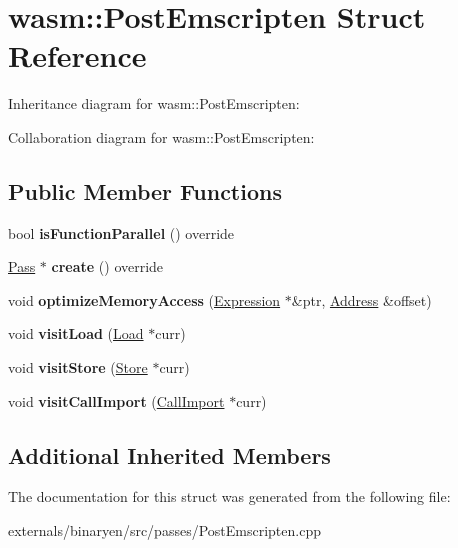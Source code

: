 \hypertarget{structwasm_1_1_post_emscripten}{}\section{wasm\+:\+:Post\+Emscripten Struct Reference}
\label{structwasm_1_1_post_emscripten}


Inheritance diagram for wasm\+:\+:Post\+Emscripten\+:


Collaboration diagram for wasm\+:\+:Post\+Emscripten\+:
\subsection*{Public Member Functions}
\begin{DoxyCompactItemize}
\item 
\mbox{\label{structwasm_1_1_post_emscripten_af1d8b75349818edc075f64f97688be9a}} 
bool {\bfseries is\+Function\+Parallel} () override
\item 
\mbox{\label{structwasm_1_1_post_emscripten_af5340c3caf93fc2c276ecdf53e2de03e}} 
\mbox{\hyperlink{classwasm_1_1_pass}{Pass}} $\ast$ {\bfseries create} () override
\item 
\mbox{\label{structwasm_1_1_post_emscripten_a4ac989443ff18b2acf380a15027c704f}} 
void {\bfseries optimize\+Memory\+Access} (\mbox{\hyperlink{classwasm_1_1_expression}{Expression}} $\ast$\&ptr, \mbox{\hyperlink{structwasm_1_1_address}{Address}} \&offset)
\item 
\mbox{\label{structwasm_1_1_post_emscripten_a066e68fe70abd895c207754ed9042f68}} 
void {\bfseries visit\+Load} (\mbox{\hyperlink{classwasm_1_1_load}{Load}} $\ast$curr)
\item 
\mbox{\label{structwasm_1_1_post_emscripten_a643c047d42e40263e22612b56abe1901}} 
void {\bfseries visit\+Store} (\mbox{\hyperlink{classwasm_1_1_store}{Store}} $\ast$curr)
\item 
\mbox{\label{structwasm_1_1_post_emscripten_a258432f4022b07aa3c3d4893bb798628}} 
void {\bfseries visit\+Call\+Import} (\mbox{\hyperlink{classwasm_1_1_call_import}{Call\+Import}} $\ast$curr)
\end{DoxyCompactItemize}
\subsection*{Additional Inherited Members}


The documentation for this struct was generated from the following file\+:\begin{DoxyCompactItemize}
\item 
externals/binaryen/src/passes/Post\+Emscripten.\+cpp\end{DoxyCompactItemize}
